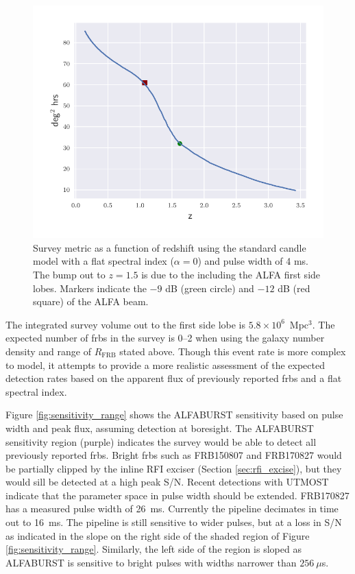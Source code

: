 \documentclass[a4paper,fleqn,usenatbib]{mnras}
\begin{document}
\begin{figure}
    \includegraphics[width=1.0\linewidth]{figures/full_sefd_z_relation.pdf}
    \caption{Survey metric as a function of redshift using the standard candle
    model with a flat spectral index ($\alpha=0$) and pulse width of 4 ms. The
    bump out to $z=1.5$ is due to the including the ALFA first side lobes.
    Markers indicate the $-9$ dB (green circle) and $-12$ dB (red square) of the
    ALFA beam.
    }
    \label{fig:full_sefd_z}
\end{figure}

The integrated survey volume out to the first side lobe is $5.8 \times
10^6$~Mpc$^3$. The expected number of \glspl{frb} in the survey is 0--2 when
using the galaxy number density and range of $R_{\textrm{FRB}}$ stated above.
Though this event rate is more complex to model, it attempts to provide a more
realistic assessment of the expected detection rates based on the apparent flux
of previously reported \glspl{frb} and a flat spectral index.

Figure \ref{fig:sensitivity_range} shows the ALFABURST sensitivity  based
on pulse width and peak flux, assuming detection at boresight. The ALFABURST
sensitivity region (purple) indicates the survey would be able to detect all
previously reported \glspl{frb}. Bright \glspl{frb} such as FRB150807 and
FRB170827 would be partially clipped by the inline RFI exciser (Section
\ref{sec:rfi_excise}), but they would sill be detected at a high peak S/N.
Recent detections with UTMOST \citep{2017MNRAS.468.3746C,atel10697,atel10867}
indicate that the parameter space in pulse width should be extended.  FRB170827
has a measured pulse width of 26~ms. Currently the pipeline decimates in time
out to 16~ms. The pipeline is still sensitive to wider pulses, but at a loss in S/N
as indicated in the slope on the right side of the shaded region of Figure
\ref{fig:sensitivity_range}.  Similarly, the left side of the region is sloped
as ALFABURST is sensitive to bright pulses with widths narrower than $256~\mu$s.
\end{document}
